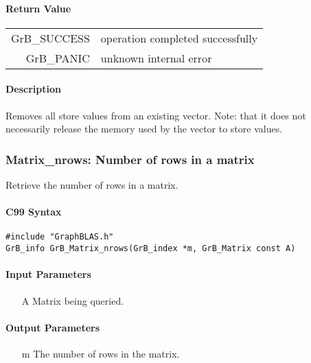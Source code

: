 \paragraph{Return Value}

\begin{tabular}{rl} 
{\sf GrB\_SUCCESS} 	& operation completed successfully \\
{\sf GrB\_PANIC}	& unknown internal error \\
\end{tabular}

\paragraph{Description}

Removes all store values from an existing vector.  Note: that it does not
necessarily release the memory used by the vector to store values.


\subsubsection{{\sf Matrix\_nrows}: Number of rows in a matrix}

Retrieve the number of rows in a matrix.

\paragraph{C99 Syntax}

\begin{verbatim}
#include "GraphBLAS.h"
GrB_info GrB_Matrix_nrows(GrB_index *m, GrB_Matrix const A)
\end{verbatim}

\paragraph{Input Parameters}

\begin{itemize}
	\item[{\sf A}] Matrix being queried.
\end{itemize}

\paragraph{Output Parameters}
\begin{itemize}
	\item[{\sf m}] The number of rows in the matrix.
\end{itemize}

